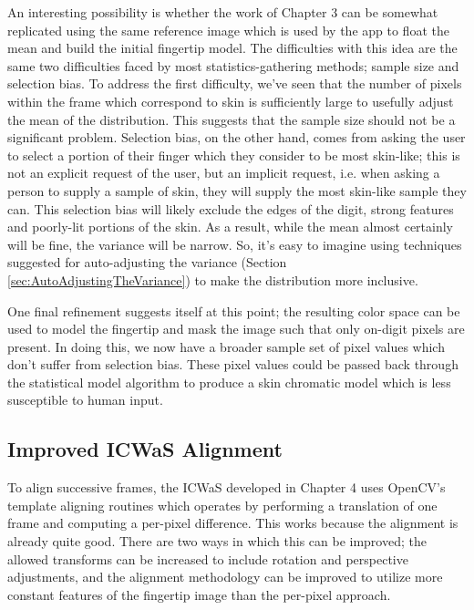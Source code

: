 An interesting possibility is whether the work of Chapter 3 can be somewhat replicated using the same reference image which is used by the app to float the mean and build the initial fingertip model. The difficulties with this idea are the same two difficulties faced by most statistics-gathering methods; sample size and selection bias. To address the first difficulty, we've seen that the number of pixels within the frame which correspond to skin is sufficiently large to usefully adjust the mean of the distribution. This suggests that the sample size should not be a significant problem. Selection bias, on the other hand, comes from asking the user to select a portion of their finger which they consider to be most skin-like; this is not an explicit request of the user, but an implicit request, i.e. when asking a person to supply a sample of skin, they will supply the most skin-like sample they can. This selection bias will likely exclude the edges of the digit, strong features and poorly-lit portions of the skin. As a result, while the mean almost certainly will be fine, the variance will be narrow. So, it's easy to imagine using techniques suggested for auto-adjusting the variance (Section \ref{sec:AutoAdjustingTheVariance}) to make the distribution more inclusive.

One final refinement suggests itself at this point; the resulting color space can be used to model the fingertip and mask the image such that only on-digit pixels are present. In doing this, we now have a broader sample set of pixel values which don't suffer from selection bias. These pixel values could be passed back through the statistical model algorithm to produce a skin chromatic model which is less susceptible to human input.

\subsection{Improved ICWaS Alignment}\label{sec:ImprovedICWaSAlignment}
To align successive frames, the ICWaS developed in Chapter 4 uses OpenCV's template aligning routines which operates by performing a translation of one frame and computing a per-pixel difference. This works because the alignment is already quite good. There are two ways in which this can be improved; the allowed transforms can be increased to include rotation and perspective adjustments, and the alignment methodology can be improved to utilize more constant features of the fingertip image than the per-pixel approach. 

